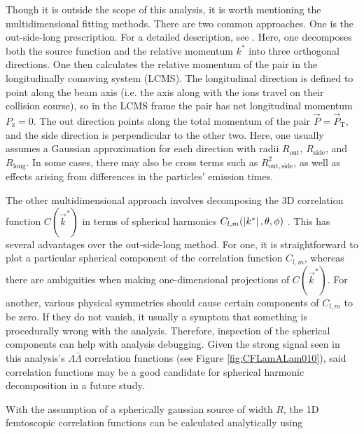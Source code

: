 Though it is outside the scope of this analysis, it is worth mentioning the multidimensional fitting methods.
There are two common approaches.
One is the out-side-long prescription.
For a detailed description, see \cite{Lisa:2005dd}.
Here, one decomposes both the source function and the relative momentum $k^*$ into three orthogonal directions.
One then calculates the relative momentum of the pair in the longitudinally comoving system (LCMS).
The longitudinal direction is defined to point along the beam axis (i.e. the axis along with the ions travel on their collision course), so in the LCMS frame the pair has net longitudinal momentum $P_\mathrm{z} = 0$.
The out direction points along the total momentum of the pair $\vec{P}=\vec{P}_{\mathrm{T}}$, and the side direction is perpendicular to the other two.
Here, one usually assumes a Gaussian approximation for each direction with radii $R_\mathrm{out}$, $R_\mathrm{side}$, and $R_\mathrm{long}$.
In some cases, there may also be cross terms such as $R^2_{\mathrm{out,side}}$, as well as effects arising from differences in the particles' emission times.

The other multidimensional approach involves decomposing the 3D correlation function $C(\vec{k}^*)$ in terms of spherical harmonics $C_{l,m}(\left\lvert k^*\right\rvert,\theta, \phi)$ \cite{Chajecki:2008vg}.
This has several advantages over the out-side-long method.
For one, it is straightforward to plot a particular spherical component of the correlation function $C_{l,m}$, whereas there are ambiguities when making one-dimensional projections of $C(\vec{k}^*)$.
For another, various physical symmetries should cause certain components of $C_{l,m}$ to be zero.
If they do not vanish, it usually a symptom that something is procedurally wrong with the analysis.
Therefore, inspection of the spherical components can help with analysis debugging.
Given the strong signal seen in this analysis's $\Lambda\bar{\Lambda}$ correlation functions (see Figure \ref{fig:CFLamALam010}), said correlation functions may be a good candidate for spherical harmonic decomposition in a future study.






 
With the assumption of a spherically gaussian source of width $R$, the 1D femtoscopic correlation functions can be calculated analytically \cite{lednicky82} using 

